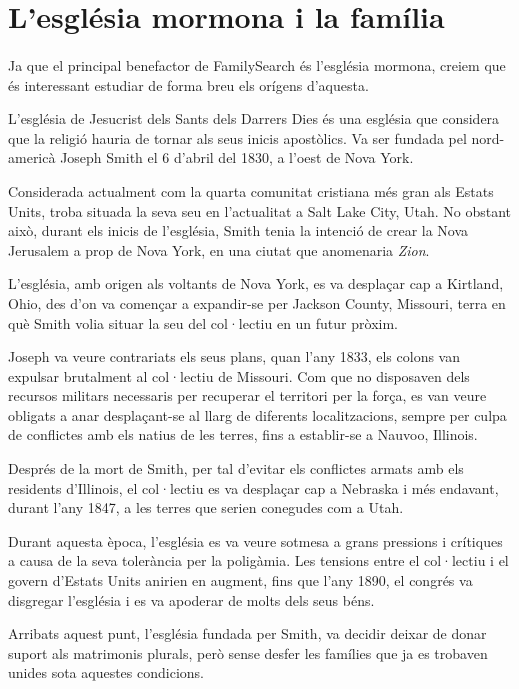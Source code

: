 \section{L'església mormona i la família}

    \paragraph{}
    Ja que el principal benefactor de FamilySearch és l'església mormona, creiem que és interessant estudiar de forma breu els orígens d'aquesta.

    L’església de Jesucrist dels Sants dels Darrers Dies és una església que considera que la religió hauria de tornar als seus inicis apostòlics. Va ser fundada pel nord-americà Joseph Smith el 6 d’abril del 1830, a l'oest de Nova York.

    Considerada actualment com la quarta comunitat cristiana més gran als Estats Units, troba situada la seva seu en l'actualitat a Salt Lake City, Utah. No obstant això, durant els inicis de l’església, Smith tenia la intenció de crear la Nova Jerusalem a prop de Nova York, en una ciutat que anomenaria \emph{Zion}.

    L’església, amb origen als voltants de Nova York, es va desplaçar cap a Kirtland, Ohio, des d'on va començar a expandir-se per Jackson County, Missouri, terra en què Smith volia situar la seu del col·lectiu en un futur pròxim.

    Joseph va veure contrariats els seus plans, quan l'any 1833, els colons van expulsar brutalment al col·lectiu de Missouri. Com que no disposaven dels recursos militars necessaris per recuperar el territori per la força, es van veure obligats a anar desplaçant-se al llarg de diferents localitzacions, sempre per culpa de conflictes amb els natius de les terres, fins a establir-se a Nauvoo, Illinois.

    Després de la mort de Smith, per tal d'evitar els conflictes armats amb els residents d'Illinois, el col·lectiu es va desplaçar cap a Nebraska i més endavant, durant l'any 1847, a les terres que serien conegudes com a Utah.

    Durant aquesta època, l'església es va veure sotmesa a grans pressions i crítiques a causa de la seva tolerància per la poligàmia. Les tensions entre el col·lectiu i el govern d'Estats Units anirien en augment, fins que l'any 1890, el congrés va disgregar l'església i es va apoderar de molts dels seus béns.

    Arribats aquest punt, l'església fundada per Smith, va decidir deixar de donar suport als matrimonis plurals, però sense desfer les famílies que ja es trobaven unides sota aquestes condicions.

